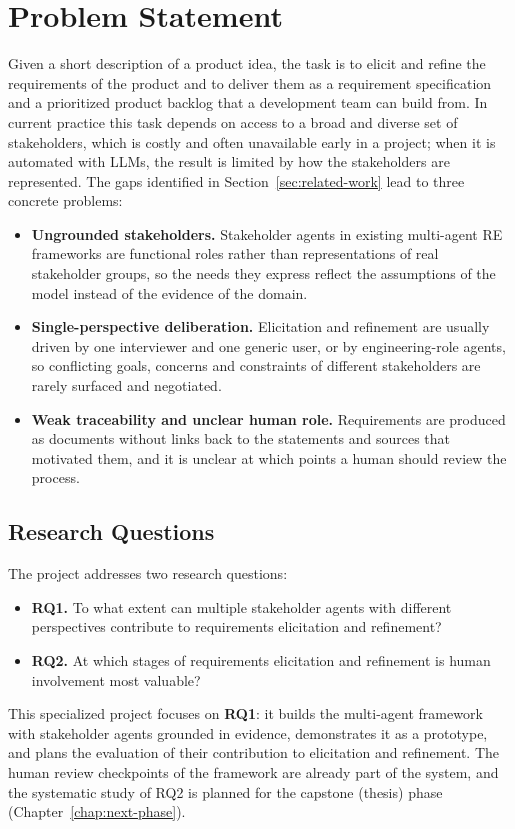 \section{Problem Statement}
\label{sec:problem-statement}

Given a short description of a product idea, the task is to elicit and refine the requirements of the product and to deliver them as a requirement specification and a prioritized product backlog that a development team can build from. In current practice this task depends on access to a broad and diverse set of stakeholders, which is costly and often unavailable early in a project; when it is automated with LLMs, the result is limited by how the stakeholders are represented. The gaps identified in Section~\ref{sec:related-work} lead to three concrete problems:
\begin{itemize}
    \item \textbf{Ungrounded stakeholders.} Stakeholder agents in existing multi-agent RE frameworks are functional roles rather than representations of real stakeholder groups, so the needs they express reflect the assumptions of the model instead of the evidence of the domain.
    \item \textbf{Single-perspective deliberation.} Elicitation and refinement are usually driven by one interviewer and one generic user, or by engineering-role agents, so conflicting goals, concerns and constraints of different stakeholders are rarely surfaced and negotiated.
    \item \textbf{Weak traceability and unclear human role.} Requirements are produced as documents without links back to the statements and sources that motivated them, and it is unclear at which points a human should review the process.
\end{itemize}

\subsection{Research Questions}
\label{sec:research-questions}

The project addresses two research questions:
\begin{itemize}
    \item \textbf{RQ1.} To what extent can multiple stakeholder agents with different perspectives contribute to requirements elicitation and refinement?
    \item \textbf{RQ2.} At which stages of requirements elicitation and refinement is human involvement most valuable?
\end{itemize}
This specialized project focuses on \textbf{RQ1}: it builds the multi-agent framework with stakeholder agents grounded in evidence, demonstrates it as a prototype, and plans the evaluation of their contribution to elicitation and refinement. The human review checkpoints of the framework are already part of the system, and the systematic study of RQ2 is planned for the capstone (thesis) phase (Chapter~\ref{chap:next-phase}).


